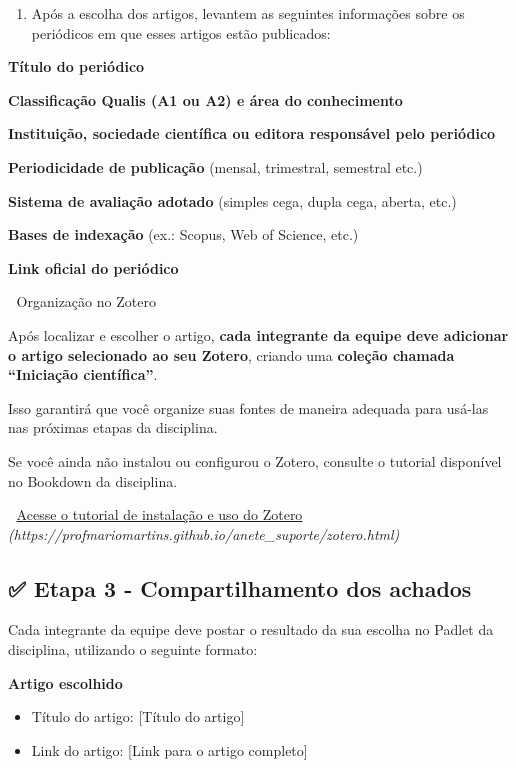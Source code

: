\documentclass[
  letterpaper,
  DIV=11,
  numbers=noendperiod]{scrreprt}
\providecommand{\tightlist}{%
  \setlength{\itemsep}{0pt}\setlength{\parskip}{0pt}}
\begin{document}
\begin{enumerate}
\def\labelenumi{\arabic{enumi}.}
\setcounter{enumi}{1}
\tightlist
\item
  Após a escolha dos artigos, levantem as seguintes informações sobre os
  periódicos em que esses artigos estão publicados:
\end{enumerate}

\textbf{Título do periódico}

\textbf{Classificação Qualis (A1 ou A2) e área do conhecimento}

\textbf{Instituição, sociedade científica ou editora responsável pelo
periódico}

\textbf{Periodicidade de publicação} (mensal, trimestral, semestral
etc.)

\textbf{Sistema de avaliação adotado} (simples cega, dupla cega, aberta,
etc.)

\textbf{Bases de indexação} (ex.: Scopus, Web of Science, etc.)

\textbf{Link oficial do periódico}

📌 Organização no Zotero

Após localizar e escolher o artigo, \textbf{cada integrante da equipe
deve adicionar o artigo selecionado ao seu Zotero}, criando uma
\textbf{coleção chamada ``Iniciação científica''}.

Isso garantirá que você organize suas fontes de maneira adequada para
usá-las nas próximas etapas da disciplina.

Se você ainda não instalou ou configurou o Zotero, consulte o tutorial
disponível no Bookdown da disciplina.

🔗 \hyperref[]{Acesse o tutorial de instalação e uso do Zotero}\\
\emph{(https://profmariomartins.github.io/anete\_suporte/zotero.html)}

\subsection{✅ Etapa 3 - Compartilhamento dos
achados}\label{etapa-3---compartilhamento-dos-achados}

Cada integrante da equipe deve postar o resultado da sua escolha no
Padlet da disciplina, utilizando o seguinte formato:

\textbf{Artigo escolhido}

\begin{itemize}
\tightlist
\item
  Título do artigo: {[}Título do artigo{]}
\item
  Link do artigo: {[}Link para o artigo completo{]}
\end{itemize}
\end{document}
